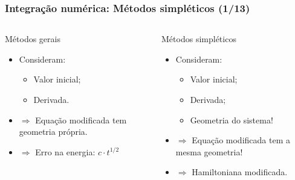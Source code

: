 \begin{frame}
\justifying
\frametitle{Integração numérica: Métodos simpléticos (1/13)}

\begin{columns}[c]
    \justifying
        \begin{block}{Métodos gerais}
            \begin{itemize}
                \item Consideram:
                    \begin{itemize}
                        \item Valor inicial;
                        \item Derivada.
                    \end{itemize}

                \pause

                \item $\Rightarrow$ Equação modificada tem geometria própria.

                \pause

                \item $\Rightarrow$ Erro na energia: $c \cdot t^{1/2}$ \cite{Brouwer1937}

                \pause
            \end{itemize}
        \end{block}
        
    \justifying
        \begin{block}{Métodos simpléticos}
            \begin{itemize}
                \item Consideram:
                    \begin{itemize}
                        \item Valor inicial;
                        \item Derivada;
                        \item Geometria do sistema!
                    \end{itemize}

                \pause

                \item $\Rightarrow$ Equação modificada tem a mesma geometria!

                \pause

                \item $\Rightarrow$ Hamiltoniana modificada.
            \end{itemize}
        \end{block}
\end{columns}


\end{frame}

